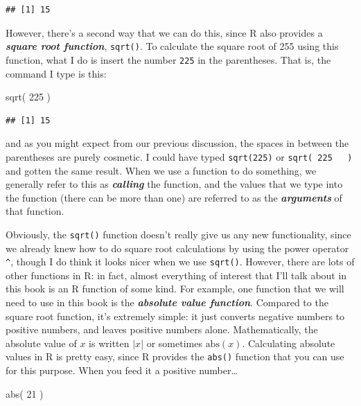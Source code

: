 \documentclass[
]{book}
\newenvironment{Shaded}{\begin{snugshade}}{\end{snugshade}}
\newcommand{\DecValTok}[1]{\textcolor[rgb]{0.00,0.00,0.81}{#1}}
\newcommand{\FunctionTok}[1]{\textcolor[rgb]{0.00,0.00,0.00}{#1}}
\newcommand{\NormalTok}[1]{#1}
\begin{document}
\begin{verbatim}
## [1] 15
\end{verbatim}

However, there's a second way that we can do this, since R also provides a \textbf{\emph{square root function}}, \texttt{sqrt()}. To calculate the square root of 255 using this function, what I do is insert the number \texttt{225} in the parentheses. That is, the command I type is this:

\begin{Shaded}
\begin{Highlighting}[]
\FunctionTok{sqrt}\NormalTok{( }\DecValTok{225}\NormalTok{ )}
\end{Highlighting}
\end{Shaded}

\begin{verbatim}
## [1] 15
\end{verbatim}

and as you might expect from our previous discussion, the spaces in between the parentheses are purely cosmetic. I could have typed \texttt{sqrt(225)} or \texttt{sqrt(\ 225\ \ \ )} and gotten the same result. When we use a function to do something, we generally refer to this as \textbf{\emph{calling}} the function, and the values that we type into the function (there can be more than one) are referred to as the \textbf{\emph{arguments}} of that function.

Obviously, the \texttt{sqrt()} function doesn't really give us any new functionality, since we already knew how to do square root calculations by using the power operator \texttt{\^{}}, though I do think it looks nicer when we use \texttt{sqrt()}. However, there are lots of other functions in R: in fact, almost everything of interest that I'll talk about in this book is an R function of some kind. For example, one function that we will need to use in this book is the \textbf{\emph{absolute value function}}. Compared to the square root function, it's extremely simple: it just converts negative numbers to positive numbers, and leaves positive numbers alone. Mathematically, the absolute value of \(x\) is written \(|x|\) or sometimes \(\mbox{abs}(x)\). Calculating absolute values in R is pretty easy, since R provides the \texttt{abs()} function that you can use for this purpose. When you feed it a positive number\ldots{}

\begin{Shaded}
\begin{Highlighting}[]
\FunctionTok{abs}\NormalTok{( }\DecValTok{21}\NormalTok{ )}
\end{Highlighting}
\end{Shaded}
\end{document}
